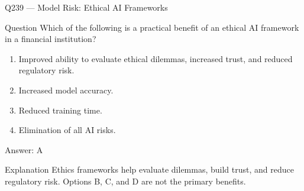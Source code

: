 \documentclass[aspectratio=169,8pt]{beamer}
\begin{document}
																																														\begin{frame}{Q239 --- Model Risk: Ethical AI Frameworks}
																																															\begin{block}{Question}
																																																Which of the following is a practical benefit of an ethical AI framework in a financial institution?
																																																\begin{enumerate}
																																																	\item Improved ability to evaluate ethical dilemmas, increased trust, and reduced regulatory risk.
																																																	\item Increased model accuracy.
																																																	\item Reduced training time.
																																																	\item Elimination of all AI risks.
																																																\end{enumerate}  \end{block}
																																																\begin{exampleblock}{Answer: A}\end{exampleblock}
																																																\begin{block}{Explanation}
																																																	Ethics frameworks help evaluate dilemmas, build trust, and reduce regulatory risk. Options B, C, and D are not the primary benefits.
																																																\end{block}
																																															\end{frame}
																																															
\end{document}
